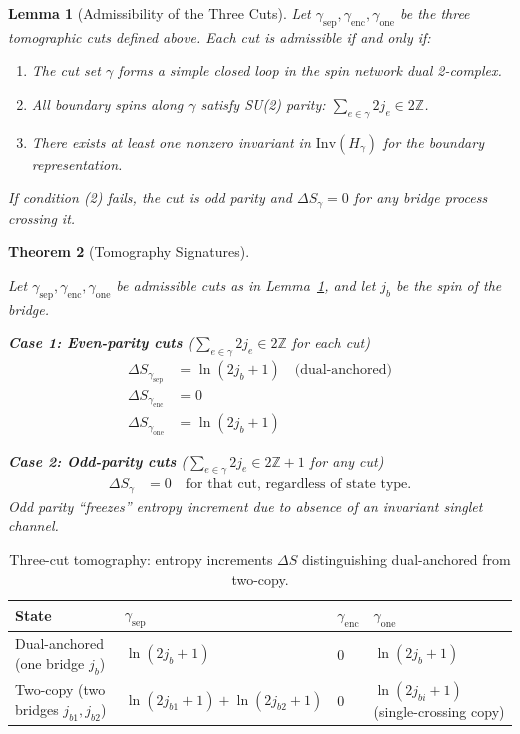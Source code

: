 \documentclass[11pt]{article}
\newcommand{\Inv}{\mathrm{Inv}}
\theoremstyle{plain}
\newtheorem{theorem}{Theorem}[section]
\newtheorem{lemma}[theorem]{Lemma}
\theoremstyle{definition}
\begin{document}
\begin{lemma}[Admissibility of the Three Cuts]
  \label{lem:admissibility}
  Let $\gamma_{\mathrm{sep}}, \gamma_{\mathrm{enc}}, \gamma_{\mathrm{one}}$ be the three tomographic cuts defined above.
  Each cut is \emph{admissible} if and only if:
  \begin{enumerate}
    \item The cut set $\gamma$ forms a simple closed loop in the spin network dual 2-complex.
    \item All boundary spins along $\gamma$ satisfy SU(2) parity: $\sum_{e \in \gamma} 2 j_e \in 2\mathbb{Z}$.
    \item There exists at least one nonzero invariant in $\Inv(H_{\gamma})$ for the boundary representation.
  \end{enumerate}
  If condition (2) fails, the cut is \emph{odd parity} and $\Delta S_\gamma = 0$ for any bridge process crossing it.
\end{lemma}

\begin{theorem}[Tomography Signatures]\label{thm:tomography}

  Let $\gamma_{\mathrm{sep}}, \gamma_{\mathrm{enc}}, \gamma_{\mathrm{one}}$ be admissible cuts as in Lemma~\ref{lem:admissibility},
  and let $j_b$ be the spin of the bridge.

  \textbf{Case 1: Even-parity cuts} ($\sum_{e \in \gamma} 2 j_e \in 2\mathbb{Z}$ for each cut)
  \begin{align}
    \Delta S_{\gamma_{\mathrm{sep}}} &= \ln(2j_b+1) \quad \text{(dual-anchored)} \\
    \Delta S_{\gamma_{\mathrm{enc}}} &= 0 \\
    \Delta S_{\gamma_{\mathrm{one}}} &= \ln(2j_b+1)
  \end{align}

  \textbf{Case 2: Odd-parity cuts} ($\sum_{e \in \gamma} 2 j_e \in 2\mathbb{Z} + 1$ for any cut)
  \begin{align}
    \Delta S_{\gamma} &= 0 \quad \text{for that cut, regardless of state type.}
  \end{align}
  Odd parity “freezes” entropy increment due to absence of an invariant singlet channel.
\end{theorem}

\begin{table}[h]
  \centering
  \setlength{\tabcolsep}{8pt}
  \begin{tabular}{llll}
    \hline
    State & $\gamma_{\mathrm{sep}}$ & $\gamma_{\mathrm{enc}}$ & $\gamma_{\mathrm{one}}$ \\
    \hline
    Dual-anchored (one bridge $j_b$)
    & $\ln(2j_b{+}1)$
    & $0$
    & $\ln(2j_b{+}1)$ \\
    Two-copy (two bridges $j_{b1},j_{b2}$)
    & $\ln(2j_{b1}{+}1)+\ln(2j_{b2}{+}1)$
    & $0$
    & $\ln(2j_{bi}{+}1)$ (single-crossing copy) \\
    \hline
  \end{tabular}
  \caption{Three-cut tomography: entropy increments $\Delta S$ distinguishing dual-anchored from two-copy.}
  \label{tab:tomography}
\end{table}
\end{document}
